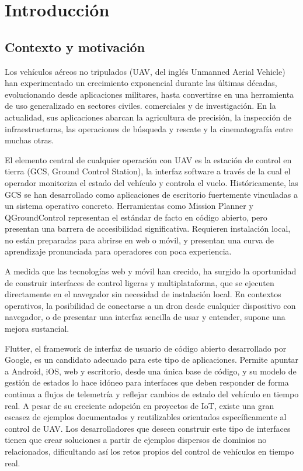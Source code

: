
\chapter{Introducción}   %

\section{Contexto y motivación}
Los vehículos aéreos no tripulados (UAV, del inglés Unmanned Aerial Vehicle) han experimentado un crecimiento exponencial durante las últimas décadas, evolucionando desde aplicaciones militares, hasta convertirse en una herramienta de uso generalizado en sectores  civiles. comerciales y de investigación. En la actualidad, sus aplicaciones abarcan la agricultura de precisión, la inspección de infraestructuras, las operaciones de búsqueda y rescate y la cinematografía entre muchas otras\cite{UAV applications}.

El elemento central de cualquier operación con UAV es la estación de control en tierra (GCS, Ground Control Station), la interfaz software a través de la cual el operador monitoriza el estado del vehículo y controla el vuelo.  Históricamente, las GCS se han desarrollado como aplicaciones de escritorio fuertemente vinculadas a un sistema operativo concreto. Herramientas como Mission Planner\cite{missionplanner} y QGroundControl\cite{qgroundcontrol} representan el estándar de facto en código abierto, pero presentan una barrera de accesibilidad significativa. Requieren instalación local, no están preparadas para abrirse en web o móvil, y presentan una curva de aprendizaje pronunciada para operadores con poca experiencia.

A medida que las tecnologías web y móvil han crecido, ha surgido la oportunidad de construir interfaces de control ligeras y multiplataforma, que se ejecuten directamente en el navegador sin necesidad de instalación local. En contextos operativos, la posibilidad de conectarse a un dron desde cualquier dispositivo con navegador, o de presentar una interfaz sencilla de usar y entender, supone una mejora sustancial. 

Flutter\cite{flutter}, el framework de interfaz de usuario de código abierto desarrollado por Google, es un candidato adecuado para este tipo de aplicaciones. Permite apuntar a Android, iOS, web y escritorio, desde una única base de código, y su modelo de gestión de estados lo hace idóneo para interfaces que deben responder de forma continua a flujos de telemetría y reflejar cambios de estado del vehículo en tiempo real. A pesar de su creciente adopción en proyectos de IoT, existe una gran escasez de ejemplos documentados y reutilizables orientados específicamente al control de UAV. Los desarrolladores que deseen construir este tipo de interfaces tienen que crear soluciones a partir de ejemplos dispersos de dominios no relacionados, dificultando así los retos propios del control de vehículos en tiempo real.

